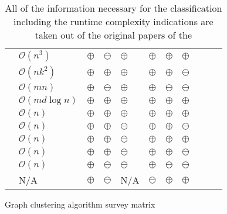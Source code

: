 \documentclass[12pt,a4paper]{report}
\begin{document}
\begin{table}[ht!]
\def\arraystretch{1.60}
\begin{tabularx}{\textwidth}{|Y||p{2.5cm}|Y|Y|Y|Y|Y|Y|Y|Y|Y|}
 \hline
  &  &  &  &  &  &  &  \\
 \hline\hline
 \cite{girvan2002community}     & \(\mathcal{O}(n^3)\)          & $\oplus$  & $\ominus$  & $\oplus$   & $\oplus$  & $\oplus$  & $\oplus$ \\\hline
 \cite{vandongen2000graph}      & \(\mathcal{O}(nk^2)\)         & $\oplus$  & $\oplus$   & $\oplus$   & $\oplus$  & $\oplus$  & $\ominus$ \\\hline
 \cite{pons2005computing}       & \(\mathcal{O}(mn)\)           & $\oplus$  & $\ominus$  & $\oplus$   & $\oplus$  & $\ominus$ & $\ominus$ \\\hline
 \cite{clauset2004modularity}   & \(\mathcal{O}(md \log{n})\)   & $\oplus$  & $\oplus$   & $\oplus$   & $\oplus$  & $\oplus$  & $\oplus$ \\\hline
 \cite{blondel2008modularity}   & \(\mathcal{O}(n)\)            & $\oplus$  & $\oplus$   & $\oplus$   & $\oplus$  & $\oplus$  & $\oplus$ \\\hline
 \cite{raghavan2007lpa}   & \(\mathcal{O}(n)\)                  & $\oplus$  & $\oplus$   & $\ominus$   & $\oplus$  & $\oplus$  & $\ominus$ \\\hline
 \cite{rosvall2008infomap}      & \(\mathcal{O}(n)\)            & $\oplus$  & $\oplus$   & $\ominus$  & $\oplus$  & $\oplus$  & $\oplus$ \\\hline
 \cite{biemann2006chinese}      & \(\mathcal{O}(n)\)            & $\oplus$  & $\oplus$   & $\ominus$  & $\oplus$  & $\oplus$  & $\ominus$ \\\hline
 \cite{reichardt2004detecting}  & \(\mathcal{O}(n)\)            & $\oplus$  & $\ominus$  & $\ominus$  & $\oplus$  & $\ominus$ & $\ominus$ \\\hline
 \cite{donetti2004detecting}    & N/A                           & $\oplus$  & $\ominus$  & N/A        & $\ominus$  & $\oplus$  & $\oplus$ \\\hline
\end{tabularx}
\caption{Graph clustering algorithm survey matrix}
\caption*{\centering
  All of the information necessary for the classification including the
  runtime complexity indications are taken out of the original papers of the
}
\end{table}
\end{document}
